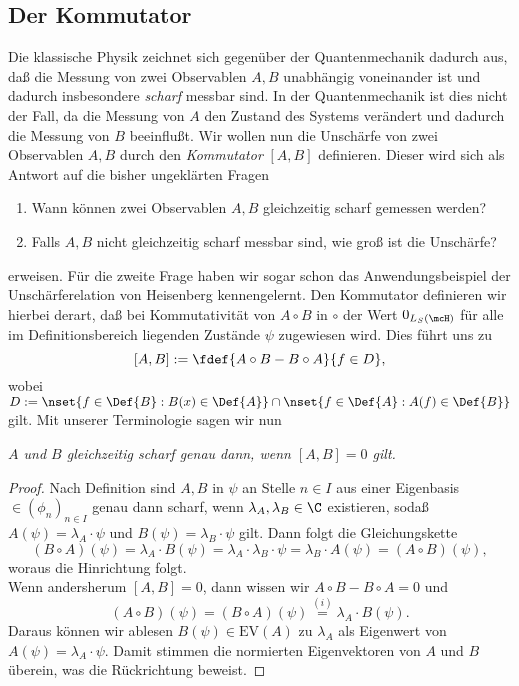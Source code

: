 \documentclass{subfiles}
\begin{document}
    \subsection{Der Kommutator}
        Die klassische Physik zeichnet sich gegenüber der Quantenmechanik dadurch aus, daß die Messung von zwei Observablen $A,B$ unabhängig voneinander ist und dadurch insbesondere \emph{scharf} messbar sind. In der Quantenmechanik ist dies nicht der Fall, da die Messung von $A$ den Zustand des Systems verändert und dadurch die Messung von $B$ beeinflußt. Wir wollen nun die Unschärfe von zwei Observablen $A,B$ durch den \emph{Kommutator} $[A,B]$ definieren. Dieser wird sich als Antwort auf die bisher ungeklärten Fragen
        \begin{enumerate}[label=(\roman*)]
            \item Wann können zwei Observablen $A,B$ gleichzeitig scharf gemessen werden?
            \item Falls $A,B$ nicht gleichzeitig scharf messbar sind, wie groß ist die Unschärfe?
        \end{enumerate}
        erweisen. Für die zweite Frage haben wir sogar schon das Anwendungsbeispiel der Unschärferelation von Heisenberg kennengelernt. Den Kommutator definieren wir hierbei derart, daß bei Kommutativität von $A\circ B$ in $\circ$ der Wert $0_{L_S(\mcH)}$ für alle im Definitionsbereich liegenden Zustände $\psi$ zugewiesen wird. Dies führt uns zu 
        \[[A,B]:= \fdef{A\circ B-B\circ A}{f\in D},\]
        wobei $D:=\nset{f\in\Def{B}:B(x)\in\Def{A}}\cap\nset{f\in\Def{A}:A(f)\in\Def{B}}$ gilt. Mit unserer Terminologie sagen wir nun 
        \begin{center}
            \textit{$A$ und $B$ gleichzeitig scharf genau dann, wenn $[A,B]=0$ gilt.}
        \end{center}
        \begin{proof}
            Nach Definition sind $A,B$ in $\psi$ an Stelle $n\in I$ aus einer Eigenbasis $\in(\phi_n)_{n\in I}$ genau dann scharf, wenn $\lambda_A,\lambda_B\in\C$ existieren, sodaß $A(\psi)=\lambda_A\cdot\psi$ und $B(\psi) = \lambda_B\cdot\psi$ gilt. Dann folgt die Gleichungskette
            \[(B\circ A)(\psi) = \lambda_A\cdot B(\psi) = \lambda_A\cdot\lambda_B\cdot\psi = \lambda_B\cdot A(\psi) = (A\circ B)(\psi),\]
            woraus die Hinrichtung folgt. \\

            Wenn andersherum $[A,B] = 0$, dann wissen wir $A\circ B - B\circ A = 0$ und
            \[(A\circ B)(\psi) = (B\circ A)(\psi) \stackrel{(i)}{=} \lambda_A\cdot B(\psi).\]
            Daraus können wir ablesen $B(\psi)\in\text{EV}(A)$ zu $\lambda_A$ als Eigenwert von $A(\psi) = \lambda_A\cdot\psi$. Damit stimmen die normierten Eigenvektoren von $A$ und $B$ überein, was die Rückrichtung beweist. 
        \end{proof}
\end{document}
